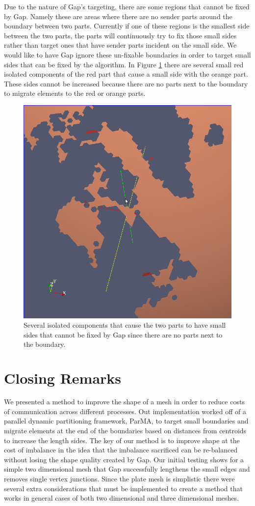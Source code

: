 \documentclass{thesis}
\begin{document}
Due to the nature of Gap's targeting, there are some regions that cannot be 
fixed by Gap. Namely these are areas where there are no sender parts around 
the boundary between two parts. Currently if one of these regions is the 
smallest side between the two parts, the parts will continuously try to fix 
those small sides rather than target ones that have sender parts incident on 
the small side. We would like to have Gap ignore these un-fixable boundaries 
in order to target small sides that can be fixed by the algorithm. In Figure 
\ref{fig:ocean} there are several small red isolated components of the red 
part that cause a small side with the orange part. These sides cannot be 
increased because there are no parts next to the boundary to migrate elements 
to the red or orange parts.

\begin{figure} [!ht]
\centering
\captionsetup{justification=centering,margin=1cm}
\includegraphics[width=.65\textwidth]{Ocean_Isolated.png}
\caption{\label{fig:ocean} \textnormal{Several isolated components that cause the two parts to have small sides that cannot be fixed by Gap since there are no parts next to the boundary.}}
\end{figure}


\chapter{Closing Remarks}

We presented a method to improve the shape of a mesh in order to reduce costs 
of communication across different processes. Out implementation worked off of 
a parallel dynamic partitioning framework, ParMA, to target small boundaries 
and migrate elements at the end of the boundaries based on distances from 
centroids to increase the length sides. The key of our method is to improve shape 
at the cost of imbalance in the idea that the imbalance sacrificed can be 
re-balanced without losing the shape quality created by Gap. Our initial testing 
shows for a simple two dimensional mesh that Gap successfully lengthens the 
small edges and removes single vertex junctions. Since the plate mesh is 
simplistic there were several extra considerations that must be implemented 
to create a method that works in general cases of both two dimensional and 
three dimensional meshes. 

\endgroup




\end{document}
